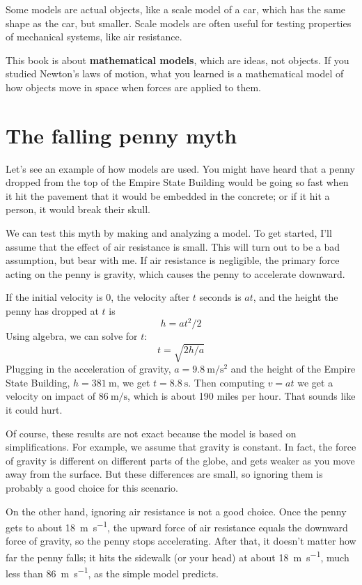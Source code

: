 \documentclass[12pt]{book}
\theoremstyle{exercise}
\begin{document}
Some models are actual objects, like a scale model of a car, which has the same shape as the car, but smaller.  Scale models are often useful for testing properties of mechanical systems, like air resistance.

This book is about {\bf mathematical models}, which are ideas, not objects.  If you studied Newton's laws of motion, what you learned is a mathematical model of how objects move in space when forces are applied to them.

\section{The falling penny myth}
\label{penny}

Let's see an example of how models are used.  You might have heard that a penny dropped from the top of the Empire State Building would be going so fast when it hit the pavement that it would be embedded in the concrete; or if it hit a person, it would break their skull.

We can test this myth by making and analyzing a model.  To get started, I'll assume that the effect of air resistance is small.  This will turn out to be a bad assumption, but bear with me.  If air resistance is negligible, the primary force acting on the penny is gravity, which causes the penny to accelerate downward.

If the initial velocity is 0, the velocity after $t$ seconds is $at$, and the height the penny has dropped at $t$ is
%
\[ h = at^2/2 \]
%
Using algebra, we can solve for $t$:
%
\[ t = \sqrt{2h/a} \]
%
Plugging in the acceleration of gravity, $a = \SI{9.8}{\meter\per\second\squared}$ and the height of the Empire State Building, $h=\SI{381}{\meter}$, we get $t = \SI{8.8}{\second}$.  Then computing $v=at$ we get a velocity on impact of $\SI{86}{\meter\per\second}$, which is about 190 miles per hour.  That sounds like it could hurt.

Of course, these results are not exact because the model is based on simplifications.  For example, we assume that gravity is constant.  In fact, the force of gravity is different on different parts of the globe, and gets weaker as you move away from the surface.  But these differences are small, so ignoring them is probably a good choice for this scenario.

On the other hand, ignoring air resistance is not a good choice.  Once the penny gets to about \SI{18}{\meter\per\second}, the upward force of air resistance equals the downward force of gravity, so the penny stops accelerating.  After that, it doesn't matter how far the penny falls; it hits the sidewalk (or your head) at about \SI{18}{\meter\per\second}, much less than \SI{86}{\meter\per\second}, as the simple model predicts.
\end{document}
